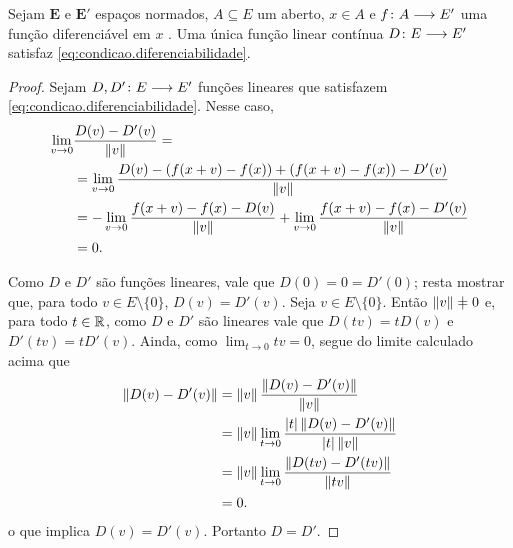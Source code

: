 \begin{proposition}
Sejam $\bm E$ e $\bm E'$ espaços normados, $A \subseteq E$ um aberto, $x \in A$ e ${f}\colon {A} \longrightarrow {E'}$ uma função diferenciável em $x$ . Uma única função linear contínua ${D}\colon {E} \longrightarrow {E'}$ satisfaz \ref{eq:condicao.diferenciabilidade}.
\end{proposition}
\begin{proof}
Sejam ${D,D'}\colon {E} \longrightarrow {E'}$ funções lineares que satisfazem \ref{eq:condicao.diferenciabilidade}. Nesse caso,
	\begin{align*}
	\lim_{v \to 0} &\frac{D(v) - D'(v)}{\left\Vert{v}\right\Vert} = \\
	&= \lim_{v \to 0} \frac{D(v) - (f(x+v)-f(x)) + (f(x+v)-f(x)) - D'(v)}{\left\Vert{v}\right\Vert} \\
	&= -\lim_{v \to 0} \frac{f(x+v)-f(x) - D(v)}{\left\Vert{v}\right\Vert} + \lim_{v \to 0} \frac{f(x+v)-f(x) - D'(v)}{\left\Vert{v}\right\Vert} \\
	&= 0.
	\end{align*}

Como $D$ e $D'$ são funções lineares, vale que $D(0) = 0 = D'(0)$; resta mostrar que, para todo $v \in E \setminus \{0\}$, $D(v) = D'(v)$. Seja $v \in E \setminus \{0\}$. Então $\nor{v} \neq 0$ e, para todo $t \in \mathbb{R}$, como $D$ e $D'$ são lineares vale que $D(tv) = tD(v)$ e $D'(tv) = tD'(v)$. Ainda, como $\lim_{t \to 0} tv = 0$, segue do limite calculado acima que
	\begin{align*}
	\left\Vert{D(v) - D'(v)}\right\Vert &= \left\Vert{v}\right\Vert \frac{\left\Vert{D(v) - D'(v)}\right\Vert}{\left\Vert{v}\right\Vert} \\
		&= \left\Vert{v}\right\Vert \lim_{t \to 0} \frac{\left\vert{t}\right\vert\left\Vert{D(v) - D'(v)}\right\Vert}{\left\vert{t}\right\vert \left\Vert{v}\right\Vert} \\
		&= \left\Vert{v}\right\Vert \lim_{t \to 0} \frac{\left\Vert{D(tv) - D'(tv)}\right\Vert}{\left\Vert{tv}\right\Vert} \\
		&= 0.
	\end{align*}
o que implica $D(v) = D'(v)$. Portanto $D=D'$.
\end{proof}

